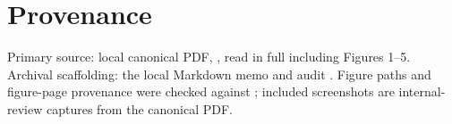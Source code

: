 \documentclass[11pt]{article}
\begin{document}
\section*{Provenance}

\begin{sloppypar}
Primary source: local canonical PDF,
, read in full
including Figures 1--5. Archival scaffolding: the local Markdown memo
 and audit
. Figure paths and
figure-page provenance were checked against
; included screenshots are internal-review
captures from the canonical PDF.
\end{sloppypar}



\end{document}
